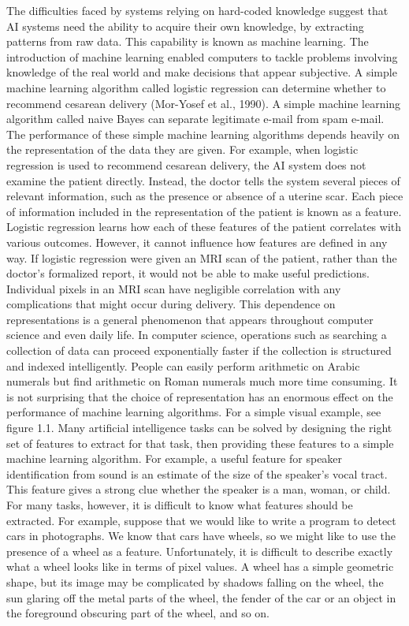 \documentclass[11pt]{article}
\begin{document}
The diﬃculties faced by systems relying on hard-coded knowledge suggest that AI systems need the ability to acquire their own knowledge, by extracting patterns from raw data.
This capability is known as machine learning.
The introduction of machine learning enabled computers to tackle problems involving knowledge of the real world and make decisions that appear subjective.
A simple machine learning algorithm called logistic regression can determine whether to recommend cesarean delivery (Mor-Yosef et al., 1990).
A simple machine learning algorithm called naive Bayes can separate legitimate e-mail from spam e-mail.
The performance of these simple machine learning algorithms depends heavily on the representation of the data they are given.
For example, when logistic regression is used to recommend cesarean delivery, the AI system does not examine the patient directly.
Instead, the doctor tells the system several pieces of relevant information, such as the presence or absence of a uterine scar.
Each piece of information included in the representation of the patient is known as a feature.
Logistic regression learns how each of these features of the patient correlates with various outcomes.
However, it cannot influence how features are defined in any way.
If logistic regression were given an MRI scan of the patient, rather than the doctor’s formalized report, it would not be able to make useful predictions.
Individual pixels in an MRI scan have negligible correlation with any complications that might occur during delivery.
This dependence on representations is a general phenomenon that appears throughout computer science and even daily life.
In computer science, operations such as searching a collection of data can proceed exponentially faster if the collection is structured and indexed intelligently.
People can easily perform arithmetic on Arabic numerals but ﬁnd arithmetic on Roman numerals much more time consuming.
It is not surprising that the choice of representation has an enormous effect on the performance of machine learning algorithms.
For a simple visual example, see ﬁgure 1.1.
Many artificial intelligence tasks can be solved by designing the right set of features to extract for that task, then providing these features to a simple machine learning algorithm.
For example, a useful feature for speaker identification from sound is an estimate of the size of the speaker’s vocal tract.
This feature gives a strong clue whether the speaker is a man, woman, or child.
For many tasks, however, it is diﬃcult to know what features should be extracted.
For example, suppose that we would like to write a program to detect cars in photographs.
We know that cars have wheels, so we might like to use the presence of a wheel as a feature.
Unfortunately, it is diﬃcult to describe exactly what a wheel looks like in terms of pixel values.
A wheel has a simple geometric shape, but its image may be complicated by shadows falling on the wheel, the sun glaring off the metal parts of the wheel, the fender of the car or an object in the foreground obscuring part of the wheel, and so on.
\end{document}
